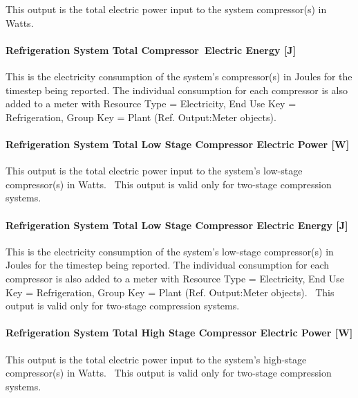 This output is the total electric power input to the system compressor(s) in Watts.

\paragraph{Refrigeration System Total Compressor~Electric Energy {[}J{]}}\label{refrigeration-system-total-compressorelectric-energy-j}

This is the electricity consumption of the system's compressor(s) in Joules for the timestep being reported. The individual consumption for each compressor is also added to a meter with Resource Type = Electricity, End Use Key = Refrigeration, Group Key = Plant (Ref. Output:Meter objects).

\paragraph{Refrigeration System Total Low Stage Compressor Electric Power {[}W{]}}\label{refrigeration-system-total-low-stage-compressor-electric-power-w}

This output is the total electric power input to the system's low-stage compressor(s) in Watts.~ This output is valid only for two-stage compression systems.

\paragraph{Refrigeration System Total Low Stage Compressor Electric Energy {[}J{]}}\label{refrigeration-system-total-low-stage-compressor-electric-energy-j}

This is the electricity consumption of the system's low-stage compressor(s) in Joules for the timestep being reported. The individual consumption for each compressor is also added to a meter with Resource Type = Electricity, End Use Key = Refrigeration, Group Key = Plant (Ref. Output:Meter objects).~ This output is valid only for two-stage compression systems.

\paragraph{Refrigeration System Total High Stage Compressor Electric Power {[}W{]}}\label{refrigeration-system-total-high-stage-compressor-electric-power-w}

This output is the total electric power input to the system's high-stage compressor(s) in Watts.~ This output is valid only for two-stage compression systems.

